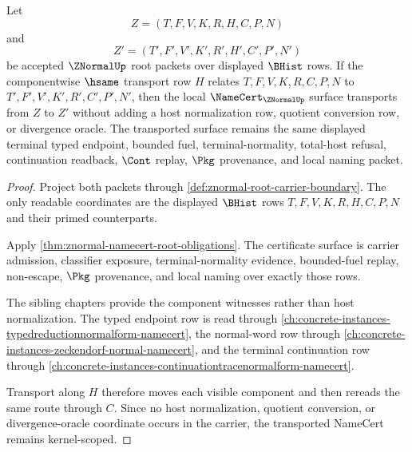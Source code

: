 \begin{theorem}
\label{thm:znormal-componentwise-namecert-transport}
Let
$$
Z=(T,F,V,K,R,H,C,P,N)
$$
and
$$
Z'=(T',F',V',K',R',H',C',P',N')
$$
be accepted $\ZNormalUp$ root packets over displayed $\BHist$ rows. If the componentwise $\hsame$ transport row $H$ relates $T,F,V,K,R,C,P,N$ to $T',F',V',K',R',C',P',N'$, then the local $\NameCert_{\ZNormalUp}$ surface transports from $Z$ to $Z'$ without adding a host normalization row, quotient conversion row, or divergence oracle. The transported surface remains the same displayed terminal typed endpoint, bounded fuel, terminal-normality, total-host refusal, continuation readback, $\Cont$ replay, $\Pkg$ provenance, and local naming packet.
\end{theorem}
\begin{proof}
Project both packets through \autoref{def:znormal-root-carrier-boundary}. The only readable coordinates are the displayed $\BHist$ rows $T,F,V,K,R,H,C,P,N$ and their primed counterparts.

Apply \autoref{thm:znormal-namecert-root-obligations}. The certificate surface is carrier admission, classifier exposure, terminal-normality evidence, bounded-fuel replay, non-escape, $\Pkg$ provenance, and local naming over exactly those rows.

The sibling chapters provide the component witnesses rather than host normalization. The typed endpoint row is read through \autoref{ch:concrete-instances-typedreductionnormalform-namecert}, the normal-word row through \autoref{ch:concrete-instances-zeckendorf-normal-namecert}, and the terminal continuation row through \autoref{ch:concrete-instances-continuationtracenormalform-namecert}.

Transport along $H$ therefore moves each visible component and then rereads the same route through $C$. Since no host normalization, quotient conversion, or divergence-oracle coordinate occurs in the carrier, the transported NameCert remains kernel-scoped.
\end{proof}

